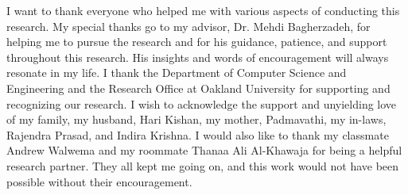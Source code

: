 I want to thank everyone who helped me with various aspects of conducting this research. My special thanks go to my advisor, Dr. Mehdi Bagherzadeh, for helping me to pursue the research and for his guidance, patience, and support throughout this research. His insights and words of encouragement will always resonate in my life. I thank the Department of Computer Science and Engineering and the Research Office at Oakland University for supporting and recognizing our research. I wish to acknowledge the support and unyielding love of my family, my husband, Hari Kishan, my mother, Padmavathi, my in-laws, Rajendra Prasad, and Indira Krishna. I would also like to thank my classmate Andrew Walwema and my roommate Thanaa Ali Al-Khawaja for being a helpful research partner. They all kept me going on, and this work would not have been possible without their encouragement.
